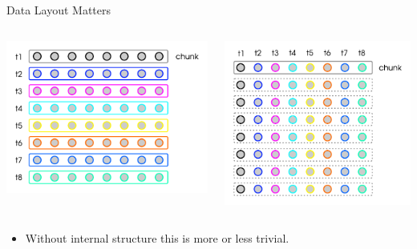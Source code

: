 \begin{frame}{Data Layout Matters}
  \begin{columns}
      \begin{center}
        \includegraphics[height=0.6\paperheight]{graphics/grid_cpu}
      \end{center}
      \begin{center}
        \includegraphics[height=0.65\paperheight]{graphics/grid_gpu}
      \end{center}
  \end{columns}
  \begin{itemize}
    \item Without internal structure this is more or less trivial.
  \end{itemize}
\end{frame}

